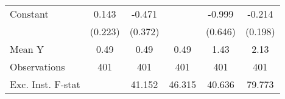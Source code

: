 {\begin{tabular}{l*{5}{c}}
\addlinespace
Constant            &       0.143         &      -0.471         &                     &      -0.999         &      -0.214         \\
                    &     (0.223)         &     (0.372)         &                     &     (0.646)         &     (0.198)         \\
\midrule
Mean Y              &        0.49         &        0.49         &        0.49         &        1.43         &        2.13         \\
Observations        &         401         &         401         &         401         &         401         &         401         \\
Exc. Inst. F-stat   &                     &      41.152         &      46.315         &      40.636         &      79.773         \\
\bottomrule
\end{tabular}
}
